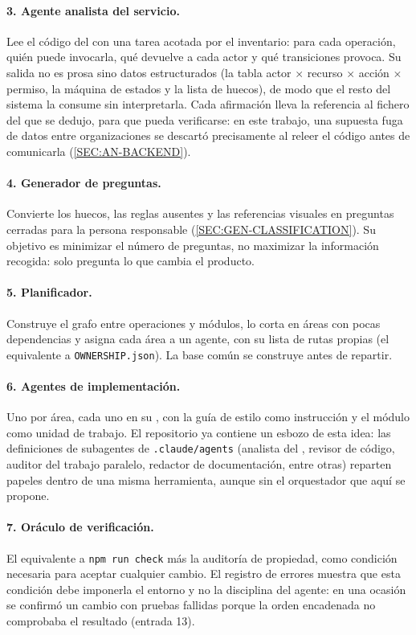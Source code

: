 \paragraph{3. Agente analista del servicio.} Lee el código del  con una tarea
acotada por el inventario: para cada operación, quién puede invocarla, qué devuelve a cada
actor y qué transiciones provoca. Su salida no es prosa sino datos estructurados (la tabla
actor $\times$ recurso $\times$ acción $\times$ permiso, la máquina de estados y la lista de
huecos), de modo que el resto del sistema la consume sin interpretarla. Cada afirmación
lleva la referencia al fichero del que se dedujo, para que pueda verificarse: en este
trabajo, una supuesta fuga de datos entre organizaciones se descartó precisamente al
releer el código antes de comunicarla (\cref{SEC:AN-BACKEND}).

\paragraph{4. Generador de preguntas.} Convierte los huecos, las reglas ausentes y las
referencias visuales en preguntas cerradas para la persona responsable (\cref{SEC:GEN-CLASSIFICATION}).
Su objetivo es minimizar el número de preguntas, no maximizar la información recogida:
solo pregunta lo que cambia el producto.

\paragraph{5. Planificador.} Construye el grafo entre operaciones y módulos, lo corta en áreas
con pocas dependencias y asigna cada área a un agente, con su lista de rutas propias
(el equivalente a \texttt{OWNERSHIP.json}). La base común se construye antes de repartir.

\paragraph{6. Agentes de implementación.} Uno por área, cada uno en su , con la
guía de estilo como instrucción y el módulo como unidad de trabajo. El repositorio ya contiene
un esbozo de esta idea: las definiciones de subagentes de \texttt{.claude/agents} (analista
del , revisor de código, auditor del trabajo paralelo, redactor de
documentación, entre otras) reparten papeles dentro de una misma herramienta, aunque sin el
orquestador que aquí se propone.

\paragraph{7. Oráculo de verificación.} El equivalente a \texttt{npm run check} más la
auditoría de propiedad, como condición necesaria para aceptar cualquier cambio. El registro
de errores muestra que esta condición debe imponerla el entorno y no la disciplina del agente:
en una ocasión se confirmó un cambio con pruebas fallidas porque la orden encadenada no
comprobaba el resultado (entrada 13).

